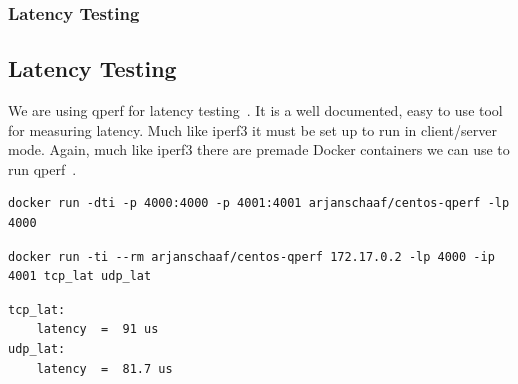 \documentclass[pdf]{beamer}
\begin{document}
\begin{frame}
	\frametitle{Latency Testing}
	\subsection{Latency Testing}
	We are using qperf for latency testing~\cite{qperf}.
	It is a well documented, easy to use tool for measuring latency.
	Much like iperf3 it must be set up to run in client/server mode.
	Again, much like iperf3 there are premade Docker containers we can use to run 
	qperf~\cite{qperfdocker}.

	\begin{lstlisting}[caption = Running a qperf docker container in server mode]
docker run -dti -p 4000:4000 -p 4001:4001 arjanschaaf/centos-qperf -lp 4000
	\end{lstlisting}

	\begin{lstlisting}[caption = Running a qperf docker container in client mode to 
measure TCP and UDP latency]
docker run -ti --rm arjanschaaf/centos-qperf 172.17.0.2 -lp 4000 -ip 4001 tcp_lat udp_lat
	\end{lstlisting}

	\begin{lstlisting}[caption = qperf output]
tcp_lat:
    latency  =  91 us
udp_lat:
    latency  =  81.7 us
	\end{lstlisting}
\end{frame}
\end{document}
